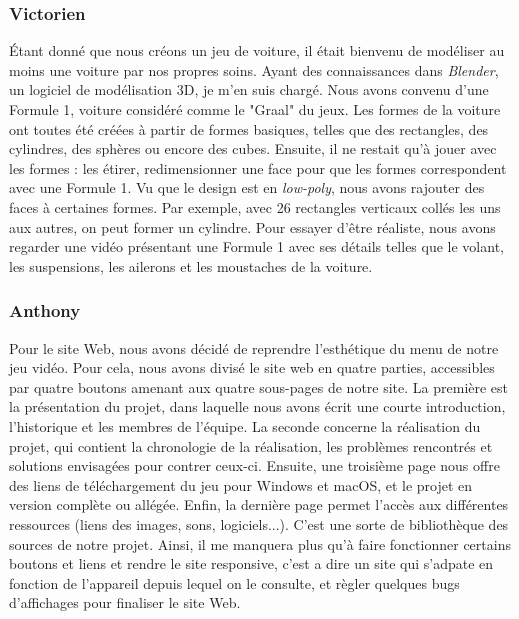 \documentclass[12pt,a4paper]{article}
\begin{document}
    \subsubsection{Victorien}
        Étant donné que nous créons un jeu de voiture, il était 
        bienvenu de modéliser au moins une voiture par nos propres soins. 
        Ayant des connaissances dans \textsl{Blender}, un logiciel 
        de modélisation 3D, je m'en suis chargé. 
        Nous avons convenu d'une Formule 1, voiture considéré comme le "Graal" du jeux. 
        Les formes de la voiture ont toutes été créées à partir de formes basiques,
        telles que des rectangles, des cylindres, des sphères ou encore des cubes. 
        Ensuite, il ne restait qu'à jouer avec les formes : les étirer, 
        redimensionner une face pour que les formes correspondent avec une Formule 1. 
        Vu que le design est en \textit{low-poly}, nous avons rajouter des
        faces à certaines formes. Par exemple, avec 26 rectangles verticaux collés les 
        uns aux autres, on peut former un cylindre.
        Pour essayer d'être réaliste, nous avons regarder une 
        vidéo présentant une Formule 1 avec ses détails telles que le volant, 
        les suspensions, les ailerons et les moustaches de la voiture.

    \subsubsection{Anthony}
        Pour le site Web, nous avons décidé de reprendre l'esthétique du
        menu de notre jeu vidéo. Pour cela, nous avons divisé le site web 
        en quatre parties, accessibles par quatre boutons amenant aux quatre 
        sous-pages de notre site. La première est la présentation du projet, dans laquelle
        nous avons écrit une courte introduction, l'historique et les membres
        de l'équipe. La seconde concerne la réalisation du projet, qui contient
        la chronologie de la réalisation, les problèmes rencontrés et solutions
        envisagées pour contrer ceux-ci. Ensuite, une troisième page nous 
        offre des liens de téléchargement du jeu pour Windows et macOS, et
        le projet en version complète ou allégée.
        Enfin, la dernière page permet l'accès aux différentes ressources
        (liens des images, sons, logiciels...). C'est une sorte de bibliothèque 
        des sources de notre projet.
        Ainsi, il me manquera plus qu'à faire fonctionner certains boutons et 
        liens et rendre le site responsive, c'est a dire un site qui s'adpate en 
        fonction de l'appareil depuis lequel on le consulte, et 
        règler quelques bugs d'affichages pour finaliser le site Web. 
\end{document}
